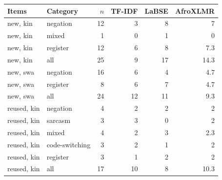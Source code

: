 \begin{tabular}{llrrrr}
\toprule
Items & Category & $n$ & TF-IDF & LaBSE & AfroXLMR \\
\midrule
new, kin & negation & 12 & 3 & 8 & 7 \\
new, kin & mixed & 1 & 0 & 1 & 0 \\
new, kin & register & 12 & 6 & 8 & 7.3 \\
new, kin & all & 25 & 9 & 17 & 14.3 \\
\midrule
new, swa & negation & 16 & 6 & 4 & 4.7 \\
new, swa & register & 8 & 6 & 7 & 4.7 \\
new, swa & all & 24 & 12 & 11 & 9.3 \\
\midrule
reused, kin & negation & 4 & 2 & 2 & 2 \\
reused, kin & sarcasm & 3 & 3 & 0 & 2 \\
reused, kin & mixed & 4 & 2 & 3 & 2.3 \\
reused, kin & code-switching & 3 & 2 & 1 & 2 \\
reused, kin & register & 3 & 1 & 2 & 2 \\
reused, kin & all & 17 & 10 & 8 & 10.3 \\
\bottomrule
\end{tabular}
